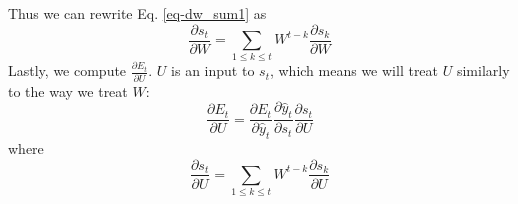 \documentclass{article}
\begin{document}
Thus we can rewrite Eq. \eqref{eq-dw_sum1} as 
\begin{equation}
    \frac{\partial s_t}{\partial W} = \sum_{1\leq k \leq t}W^{t - k}\frac{\partial s_k}{\partial W}    
\end{equation}
Lastly, we compute $\frac{\partial E_t}{\partial U}$. $U$ is an input to $s_t$, which means we will treat $U$ similarly to the way we treat $W$:
\begin{equation}
    \frac{\partial E_t}{\partial U} = \frac{\partial E_t}{\partial \hat{y}_t}\frac{\partial \hat{y}_t}{\partial s_t}\frac{\partial s_t}{\partial U}
\end{equation}
where 
\begin{equation}
    \frac{\partial s_t}{\partial U} = \sum_{1\leq k \leq t}W^{t - k}\frac{\partial s_k}{\partial U}    
\end{equation}
\end{document}
